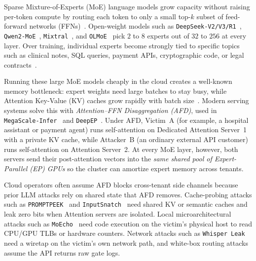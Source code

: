 \documentclass[11pt,a4paper]{article}
\renewcommand{\_}{\textunderscore\allowbreak}
\theoremstyle{definition}
\theoremstyle{remark}
\begin{document}
Sparse Mixture-of-Experts (MoE) language models grow capacity without raising per-token compute by routing each token to only a small top-$k$ subset of feed-forward networks (FFNs)~\cite{shazeer2017outrageously,fedus2022switch}. Open-weight models such as \texttt{DeepSeek-V2/V3/R1}~\cite{deepseek2024v2,deepseek2025v3,deepseek2025r1}, \texttt{Qwen2-MoE}~\cite{yang2024qwen2moe}, \texttt{Mixtral}~\cite{jiang2024mixtral}, and \texttt{OLMoE}~\cite{muennighoff2025olmoe} pick $2$ to $8$ experts out of $32$ to $256$ at every layer. Over training, individual experts become strongly tied to specific topics such as clinical notes, SQL queries, payment APIs, cryptographic code, or legal contracts~\cite{dai2024deepseekmoe}.

Running these large MoE models cheaply in the cloud creates a well-known memory bottleneck: expert weights need large batches to stay busy, while Attention Key-Value (KV) caches grow rapidly with batch size~\cite{kwon2023vllm,zheng2024sglang,zhong2024distserve,patel2024splitwise}. Modern serving systems solve this with \emph{Attention--FFN Disaggregation (AFD)}, used in \texttt{MegaScale-Infer}~\cite{zhu2025megascaleinfer} and \texttt{DeepEP}~\cite{zhao2025deepep}. Under AFD, Victim~A (for example, a hospital assistant or payment agent) runs self-attention on Dedicated Attention Server~1 with a private KV cache, while Attacker~B (an ordinary external API customer) runs self-attention on Attention Server~2. At every MoE layer, however, both servers send their post-attention vectors into the \emph{same shared pool of Expert-Parallel (EP) GPUs} so the cluster can amortize expert memory across tenants.

Cloud operators often assume AFD blocks cross-tenant side channels because prior LLM attacks rely on shared state that AFD removes. Cache-probing attacks such as \texttt{PROMPTPEEK}~\cite{wu2025promptpeek} and \texttt{InputSnatch}~\cite{zheng2025inputsnatch} need shared KV or semantic caches and leak zero bits when Attention servers are isolated. Local microarchitectural attacks such as \texttt{MoEcho}~\cite{ding2025moecho} need code execution on the victim's physical host to read CPU/GPU TLBs or hardware counters. Network attacks such as \texttt{Whisper Leak}~\cite{microsoft2025whisperleak} need a wiretap on the victim's own network path, and white-box routing attacks~\cite{patel2026routingmembership} assume the API returns raw gate logs.
\end{document}
